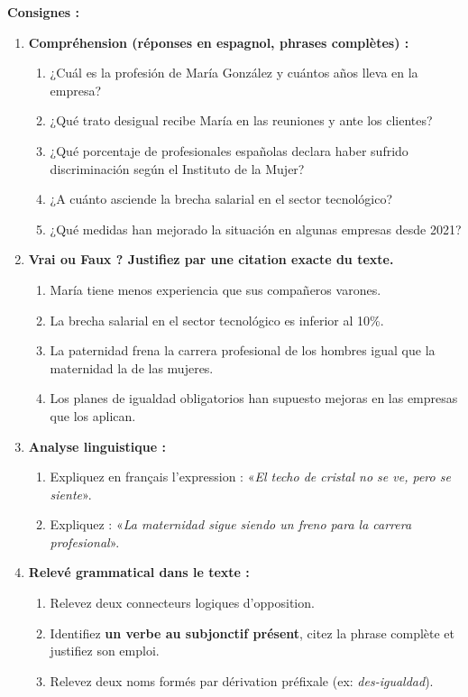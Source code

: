 \documentclass[11pt]{article}
\begin{document}
\begin{exercice}
\textbf{Consignes :}
\begin{enumerate}
\item \textbf{Compréhension (réponses en espagnol, phrases complètes) :}
\begin{enumerate}
\item ¿Cuál es la profesión de María González y cuántos años lleva en la empresa?
\item ¿Qué trato desigual recibe María en las reuniones y ante los clientes?
\item ¿Qué porcentaje de profesionales españolas declara haber sufrido discriminación según el Instituto de la Mujer?
\item ¿A cuánto asciende la brecha salarial en el sector tecnológico?
\item ¿Qué medidas han mejorado la situación en algunas empresas desde 2021?
\end{enumerate}
\item \textbf{Vrai ou Faux ? Justifiez par une citation exacte du texte.}
\begin{enumerate}
\item María tiene menos experiencia que sus compañeros varones.
\item La brecha salarial en el sector tecnológico es inferior al 10\%.
\item La paternidad frena la carrera profesional de los hombres igual que la maternidad la de las mujeres.
\item Los planes de igualdad obligatorios han supuesto mejoras en las empresas que los aplican.
\end{enumerate}
\item \textbf{Analyse linguistique :}
\begin{enumerate}
\item Expliquez en français l'expression : «\emph{El techo de cristal no se ve, pero se siente}».
\item Expliquez : «\emph{La maternidad sigue siendo un freno para la carrera profesional}».
\end{enumerate}
\item \textbf{Relevé grammatical dans le texte :}
\begin{enumerate}
\item Relevez deux connecteurs logiques d'opposition.
\item Identifiez \textbf{un verbe au subjonctif présent}, citez la phrase complète et justifiez son emploi.
\item Relevez deux noms formés par dérivation préfixale (ex: \emph{des-igualdad}).
\end{enumerate}
\end{enumerate}
\end{exercice}
\end{document}
